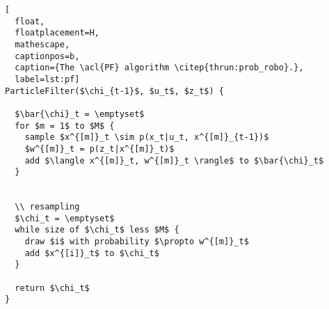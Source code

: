 \begin{lstlisting}[
  float,
  floatplacement=H,
  mathescape,
  captionpos=b,
  caption={The \acl{PF} algorithm \citep{thrun:prob_robo}.},
  label=lst:pf]
ParticleFilter($\chi_{t-1}$, $u_t$, $z_t$) {

  $\bar{\chi}_t = \emptyset$
  for $m = 1$ to $M$ {
    sample $x^{[m]}_t \sim p(x_t|u_t, x^{[m]}_{t-1})$
    $w^{[m]}_t = p(z_t|x^{[m]}_t)$
    add $\langle x^{[m]}_t, w^{[m]}_t \rangle$ to $\bar{\chi}_t$
  }


  \\ resampling
  $\chi_t = \emptyset$
  while size of $\chi_t$ less $M$ {
    draw $i$ with probability $\propto w^{[m]}_t$
    add $x^{[i]}_t$ to $\chi_t$
  }

  return $\chi_t$
}
\end{lstlisting}
